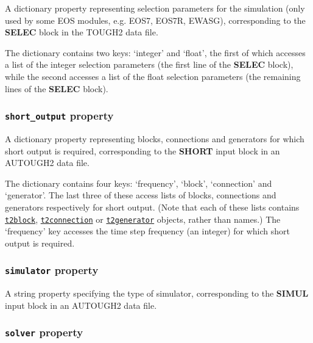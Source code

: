 A dictionary property representing selection parameters for the simulation (only used by some EOS modules, e.g. EOS7, EOS7R, EWASG), corresponding to the \textbf{SELEC} block in the TOUGH2 data file.

The dictionary contains two keys: `integer' and `float', the first of which accesses a list of the integer selection parameters (the first line of the \textbf{SELEC} block), while the second accesses a list of the float selection parameters (the remaining lines of the \textbf{SELEC} block).

\begin{snugshade}
\subsubsection{\texttt{short\_output} property}
\end{snugshade}
\label{sec:t2data:short_output}

A dictionary property representing blocks, connections and generators for which short output is required, corresponding to the \textbf{SHORT} input block in an AUTOUGH2 data file.

The dictionary contains four keys: `frequency', `block', `connection' and `generator'. The last three of these access lists of blocks, connections and generators respectively for short output.  (Note that each of these lists contains \hyperref[t2blockobjects]{\texttt{t2block}}, \hyperref[t2connectionobjects]{\texttt{t2connection}} or \hyperref[t2generatorobjects]{\texttt{t2generator}} objects, rather than names.)  The `frequency' key accesses the time step frequency (an integer) for which short output is required.

\begin{snugshade}
\subsubsection{\texttt{simulator} property}
\end{snugshade}
\label{sec:t2data:simulator}

A string property specifying the type of simulator, corresponding to the \textbf{SIMUL} input block in an AUTOUGH2 data file.

\begin{snugshade}
\subsubsection{\texttt{solver} property}
\end{snugshade}
\label{sec:t2data:solver}

